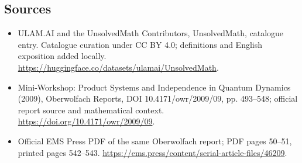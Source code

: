 \documentclass[11pt]{article}
\begin{document}
\subsection{Sources}
\begin{itemize}
\item[\hypertarget{source:statement:1}{S1}] ULAM.AI and the UnsolvedMath Contributors, UnsolvedMath, catalogue entry. Catalogue curation under CC BY 4.0; definitions and English exposition added locally.
\url{https://huggingface.co/datasets/ulamai/UnsolvedMath}.
\item[\hypertarget{source:statement:2}{S2}] Mini-Workshop: Product Systems and Independence in Quantum Dynamics (2009), Oberwolfach Reports, DOI 10.4171/owr/2009/09, pp. 493--548; official report source and mathematical context.
\url{https://doi.org/10.4171/owr/2009/09}.
\item[\hypertarget{source:statement:3}{S3}] Official EMS Press PDF of the same Oberwolfach report; PDF pages 50--51, printed pages 542--543.
\url{https://ems.press/content/serial-article-files/46209}.
\end{itemize}
\label{end:statement}
\end{document}
